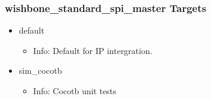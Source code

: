 \subsubsection{wishbone\_standard\_spi\_master Targets}
\begin{itemize}
\item default
	\begin{itemize}
	\item[$\space$] Info: Default for IP intergration.
	\end{itemize}
\item sim\_cocotb
	\begin{itemize}
	\item[$\space$] Info: Cocotb unit tests
	\end{itemize}
\end{itemize}
